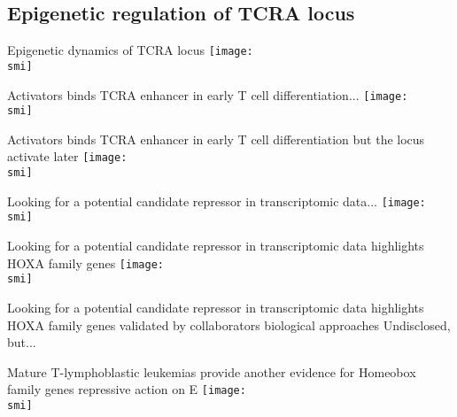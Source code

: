 \documentclass[10pt]{beamer}
\def\smi{out/ln/updir/mw-gcthesis-oral/library.bib}
\begin{document}
    \subsection{Epigenetic regulation of TCRA locus}
    \begin{frame}{Epigenetic dynamics of TCRA locus}
      \def\smi{out/ln/updir/mw-gcthesis-oral/ink/chromatin-states/genome-view/tcra.pdf}
      \texttt{[image: \\smi]}
    \end{frame}
    \begin{frame}{Activators binds TCRA enhancer in early T cell differentiation...}
      \def\smi{out/ln/updir/mw-gcthesis-oral/ink/ea-tf-mouse-chip.pdf}
      \texttt{[image: \\smi]}%
    \end{frame}
    \begin{frame}{Activators binds TCRA enhancer in early T cell differentiation but the locus activate later}
      \def\smi{out/ln/updir/mw-gcthesis-oral/ink/ea-tf-mouse.pdf}
      \texttt{[image: \\smi]}%
    \end{frame}
    \begin{frame}{Looking for a potential candidate repressor in transcriptomic data...}
      \def\smi{out/ln/updir/mw-gcthesis-oral/ink/rna-clusters/all.pdf}
      \texttt{[image: \\smi]}
    \end{frame}
    \begin{frame}{Looking for a potential candidate repressor in transcriptomic data highlights HOXA family genes}
      \def\smi{out/ln/updir/mw-gcthesis-oral/ink/rna-clusters/c13-tf.pdf}
      \texttt{[image: \\smi]}
    \end{frame}
    \begin{frame}{Looking for a potential candidate repressor in transcriptomic data highlights HOXA family genes validated by collaborators biological approaches}
      Undisclosed, but...
    \end{frame}
    \begin{frame}{Mature T-lymphoblastic leukemias provide another evidence for Homeobox family genes repressive action on E\textalpha{}}
      \def\smi{out/ln/updir/mw-gcthesis-oral/ink/tall/H3K27ac_HOXA5-9_TLX1_TLX3_ealpha_barplot.png}
      \texttt{[image: \\smi]}%
    \end{frame}
\end{document}
